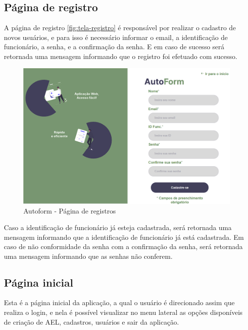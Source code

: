 \subsection{Página de registro}
A página de registro \autoref{fig:tela-registro} é responsável por realizar o cadastro de novos usuários, e para isso é necessário informar o email, a identificação de funcionário, a senha, e a confirmação da senha. E em caso de sucesso será retornada uma mensagem informando que o registro foi efetuado com sucesso.

\begin{figure}[htb]
    \caption{\label{fig:tela-registro}Autoform - Página de registros}
    \begin{center}
        \includegraphics[scale=0.6]{imagens/registro-autoform.png}   
     \end{center}
\end{figure}
Caso a identificação de funcionário já esteja cadastrada, será retornada uma mensagem informando que a identificação de funcionário já está cadastrada.
Em caso de não conformidade da senha com a confirmação da senha, será retornada uma mensagem informando que as senhas não conferem.

\subsection{Página inicial}
Esta é a página inicial da aplicação, a qual o usuário é direcionado assim que realiza o login, e nela é possível visualizar no menu lateral as opções disponíveis de criação de AEL, cadastros, usuários e sair da aplicação.

